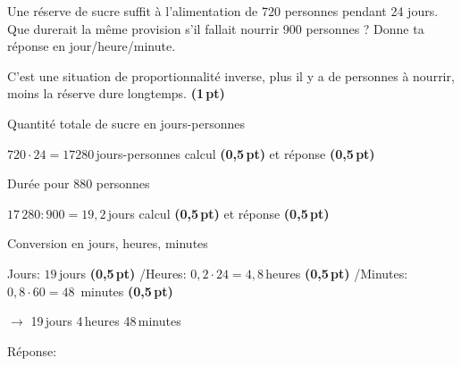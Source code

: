 
\question[5]
Une réserve de sucre suffit à l'alimentation de 720 personnes pendant 24 jours. Que durerait la même provision s'il fallait nourrir 900 personnes ? Donne ta réponse en jour/heure/minute.

\vspace{10pt}{\footnotesize\raggedleft Espace pour ta démarche et tes calculs\par}
\begin{solutionorgrid}[180pt]

\vspace{5pt}
C'est une situation de proportionnalité inverse, plus il y a de personnes à nourrir, moins la réserve dure longtemps. \hfill \textbf{(1\,pt)}

\vspace{15pt}
Quantité totale de sucre en jours-personnes

\vspace{5pt}$720 \cdot 24  = 17 280$\,jours-personnes \hfill calcul \textbf{(0,5\,pt)} et réponse \textbf{(0,5\,pt)}

\vspace{15pt}
Durée pour 880 personnes

\vspace{5pt}$17\,280 : 900 = 19,2$\,jours \hfill calcul \textbf{(0,5\,pt)} et réponse \textbf{(0,5\,pt)}

\vspace{15pt}
Conversion en jours, heures, minutes

\vspace{5pt}Jours: $19$\,jours \textbf{(0,5\,pt)} \quad/\quad Heures: $0,2 \cdot 24 = 4,8$\,heures \textbf{(0,5\,pt)} \quad/\quad Minutes: $0,8 \cdot 60 = 48$\, minutes \textbf{(0,5\,pt)}

$\longrightarrow$ 19\,jours 4\,heures 48\,minutes
\end{solutionorgrid}

\begin{tcolorbox}[enhanced jigsaw, interior hidden, colframe=box, parbox=false]%
Réponse: 
\end{tcolorbox}



